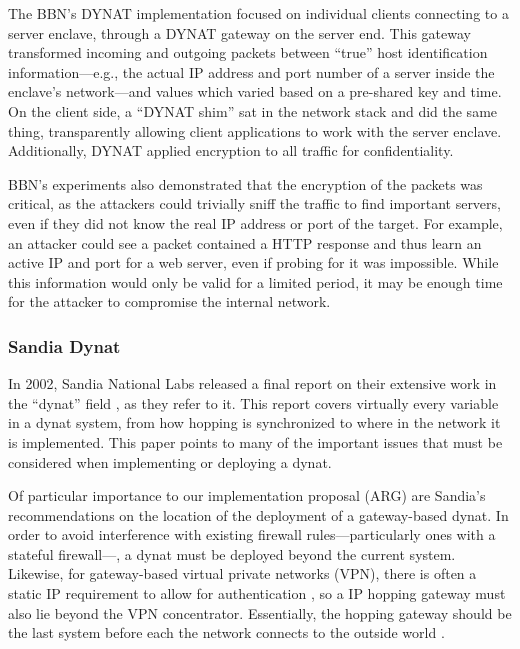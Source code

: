 \par The BBN's DYNAT implementation focused on individual clients connecting to a server enclave, through a DYNAT gateway on the server end. This gateway transformed incoming and outgoing packets between ``true'' host identification information---e.g., the actual IP address and port number of a server inside the enclave's network---and values which varied based on a pre-shared key and time. On the client side, a ``DYNAT shim'' sat in the network stack and did the same thing, transparently allowing client applications to work with the server enclave. Additionally, DYNAT applied encryption to all traffic for confidentiality.

\par BBN's experiments also demonstrated that the encryption of the packets was critical, as the attackers could trivially sniff the traffic to find important servers, even if they did not know the real IP address or port of the target. For example, an attacker could see a packet contained a HTTP response and thus learn an active IP and port for a web server, even if probing for it was impossible. While this information would only be valid for a limited period, it may be enough time for the attacker to compromise the internal network.

\subsubsection{Sandia Dynat}
\par In 2002, Sandia National Labs released a final report on their extensive work in the ``dynat'' field \cite{SandiaDynat}, as they refer to it. This report covers virtually every variable in a dynat system, from how hopping is synchronized to where in the network it is implemented. This paper points to many of the important issues that must be considered when implementing or deploying a dynat.

\par Of particular importance to our implementation proposal (ARG) are Sandia's recommendations on the location of the deployment of a gateway-based dynat. In order to avoid interference with existing firewall rules---particularly ones with a stateful firewall---, a dynat must be deployed beyond the current system. Likewise, for gateway-based virtual private networks (VPN), there is often a static IP requirement to allow for authentication \cite{SandiaDynat}, so a IP hopping gateway must also lie beyond the VPN concentrator. Essentially, the hopping gateway should be the last system before each the network connects to the outside world \cite{SandiaDynat}.

